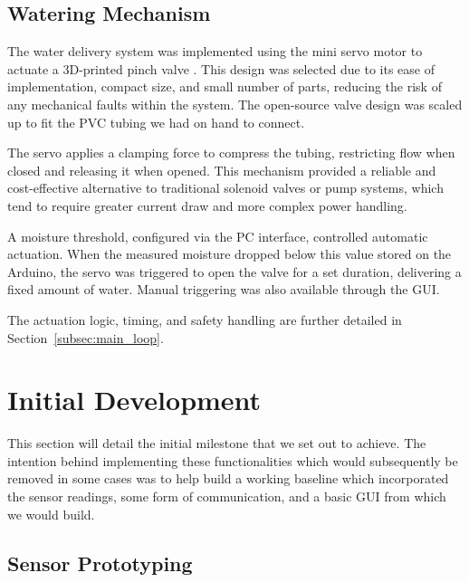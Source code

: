 \documentclass[a4paper,11pt]{article}
\begin{document}
\subsection{Watering Mechanism}
\label{sec:water_system}

The water delivery system was implemented using the mini servo motor to actuate a 
3D-printed pinch valve \cite{pinch_valve_design}. 
This design was selected due to its ease of implementation, compact size, 
and small number of parts,
reducing the risk of any mechanical faults within the system. 
The open-source valve design was scaled up 
to fit the PVC tubing we had on hand to connect.

The servo applies a clamping force to compress the tubing, restricting flow when closed 
and releasing it when opened. This mechanism provided a reliable and cost-effective 
alternative to traditional solenoid valves or pump systems, which tend to require 
greater current draw and more complex power handling.

A moisture threshold, configured via the PC interface, controlled automatic actuation. 
When the measured moisture dropped below this value stored on the Arduino, 
the servo was triggered to open the valve for a set duration, 
delivering a fixed amount of water. 
Manual triggering was also available through the GUI.

The actuation logic, timing, and safety handling are further detailed in 
Section~\ref{subsec:main_loop}.

\section{Initial Development}
\label{sec:initial_development}

This section will detail the initial milestone that we set out to achieve.
The intention behind implementing these functionalities
which would subsequently be removed in some cases
was to help build a working baseline which incorporated the sensor readings,
some form of communication, and a basic GUI from which we would build.

\subsection{Sensor Prototyping}
\label{sec:sensor_prototyping}
\end{document}
